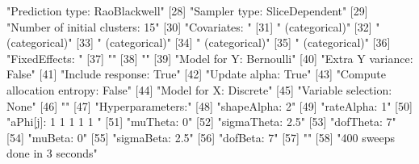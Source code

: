 \documentclass{article}
\begin{document}
\begin{description}
\begin{Schunk}
\begin{Soutput}
[27] "Prediction type: RaoBlackwell"                                             
[28] "Sampler type: SliceDependent"                                              
[29] "Number of initial clusters: 15"                                            
[30] "Covariates: "                                                              
[31] " (categorical)"                                                 
[32] " (categorical)"                                                 
[33] " (categorical)"                                                 
[34] " (categorical)"                                                 
[35] " (categorical)"                                                 
[36] "FixedEffects: "                                                            
[37] ""                                                           
[38] ""                                                           
[39] "Model for Y: Bernoulli"                                                    
[40] "Extra Y variance: False"                                                   
[41] "Include response: True"                                                    
[42] "Update alpha: True"                                                        
[43] "Compute allocation entropy: False"                                         
[44] "Model for X: Discrete"                                                     
[45] "Variable selection: None"                                                  
[46] ""                                                                          
[47] "Hyperparameters:"                                                          
[48] "shapeAlpha: 2"                                                             
[49] "rateAlpha: 1"                                                              
[50] "aPhi[j]: 1 1 1 1 1 "                                                       
[51] "muTheta: 0"                                                                
[52] "sigmaTheta: 2.5"                                                           
[53] "dofTheta: 7"                                                               
[54] "muBeta: 0"                                                                 
[55] "sigmaBeta: 2.5"                                                            
[56] "dofBeta: 7"                                                                
[57] ""                                                                          
[58] "400 sweeps done in 3 seconds"                                              
\end{Soutput}
\end{Schunk}


\end{description}
\end{document}
